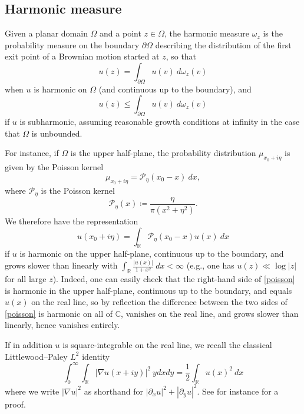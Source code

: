 \documentclass[12pt]{amsart}
\newcommand{\R}{\mathbb{R}}
\newcommand{\C}{\mathbb{C}}
\newcommand{\Poisson}{\mathcal{P}}
\begin{document}
\subsection{Harmonic measure}

Given a planar domain $\Omega$ and a point $z \in \Omega$, the harmonic measure $\omega_z$ is the probability measure on the boundary $\partial \Omega$ describing the distribution of the first exit point of a Brownian motion started at $z$, so that
\begin{equation}\label{harmonic}
    u(z) = \int_{\partial \Omega} u(v)\ d\omega_z(v)
\end{equation}
when $u$ is harmonic on $\Omega$ (and continuous up to the boundary), and
\begin{equation}\label{subharmonic}
    u(z) \leq \int_{\partial \Omega} u(v)\ d\omega_z(v)
\end{equation}
if $u$ is subharmonic, assuming reasonable growth conditions at infinity in the case that $\Omega$ is unbounded.

For instance, if $\Omega$ is the upper half-plane, the probability distribution $\mu_{x_0+i\eta}$ is given by the Poisson kernel
\begin{equation}\label{poisson-mes}
 \mu_{x_0+i\eta} = \Poisson_\eta(x_0-x)\ dx,
\end{equation}
where $\Poisson_\eta$ is the Poisson kernel
\begin{equation}\label{poisson-kernel}
 \Poisson_\eta(x) \coloneqq \frac{\eta}{\pi(x^2 + \eta^2)}.
\end{equation}
We therefore have the representation
\begin{equation}\label{poisson}
 u(x_0+i\eta) = \int_\R \Poisson_\eta(x_0-x) u(x)\ dx
\end{equation}
if $u$ is harmonic on the upper half-plane, continuous up to the boundary, and grows slower than linearly with $\int_\R \frac{|u(x)|}{1+x^2}\ dx < \infty$ (e.g., one has $u(z) \ll \log |z|$ for all large $z$).  Indeed, one can easily check that the right-hand side of \eqref{poisson} is harmonic in the upper half-plane, continuous up to the boundary, and equals $u(x)$ on the real line, so by reflection the difference between the two sides of \eqref{poisson} is harmonic on all of $\C$, vanishes on the real line, and grows slower than linearly, hence vanishes entirely.

If in addition $u$ is square-integrable on the real line, we recall the classical Littlewood--Paley $L^2$ identity
\begin{equation}\label{littlewood-paley}
     \int_0^\infty \int_\R |\nabla u(x+iy)|^2\ y dx dy = \frac{1}{2} \int_{\R} u(x)^2\ dx
\end{equation}
where we write $|\nabla u|^2$ as shorthand for $|\partial_x u|^2 + |\partial_y u|^2$.  See for instance \cite[\S IV.1.2]{stein} for a proof.
\end{document}
